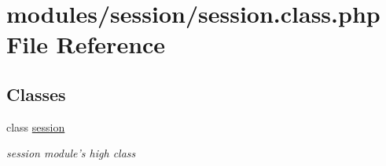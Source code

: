 \hypertarget{session_8class_8php}{\section{modules/session/session.class.\-php File Reference}
\label{session_8class_8php}
}
\subsection*{Classes}
\begin{DoxyCompactItemize}
\item 
class \hyperlink{classsession}{session}
\begin{DoxyCompactList}\small\item\em session module's high class \end{DoxyCompactList}\end{DoxyCompactItemize}
